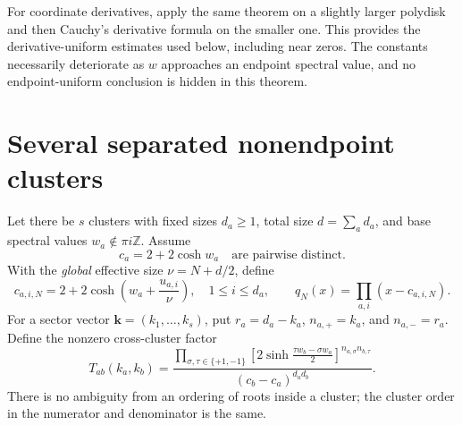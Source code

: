 \documentclass[11pt,a4paper]{article}
\numberwithin{equation}{section}
\theoremstyle{definition}
\theoremstyle{remark}
\newcommand{\ZZ}{\mathbb Z}
\newcommand{\bk}{\boldsymbol{k}}
\begin{document}
For coordinate derivatives, apply the same theorem on a slightly larger
polydisk and then Cauchy's derivative formula on the smaller one. This
provides the derivative-uniform estimates used below, including near
zeros. The constants necessarily deteriorate as $w$ approaches an
endpoint spectral value, and no endpoint-uniform conclusion is hidden
in this theorem.

\section{Several separated nonendpoint clusters}\label{ic:sec:multi}
Let there be $s$ clusters with fixed sizes $d_a\ge1$, total size
$d=\sum_a d_a$, and base spectral values $w_a\notin\pi i\ZZ$. Assume
\begin{equation}\label{ic:eq:distinctbases}
 c_a=2+2\cosh w_a\quad\text{are pairwise distinct}.
\end{equation}
With the \emph{global} effective size $\nu=N+d/2$, define
\begin{equation}\label{ic:eq:multiroots}
 c_{a,i,N}=2+2\cosh\left(w_a+\frac{u_{a,i}}\nu\right),
 \quad 1\le i\le d_a,\qquad
 q_N(x)=\prod_{a,i}(x-c_{a,i,N}).
\end{equation}
For a sector vector $\bk=(k_1,\ldots,k_s)$, put
$r_a=d_a-k_a$, $n_{a,+}=k_a$, and $n_{a,-}=r_a$. Define the nonzero
cross-cluster factor
\begin{equation}\label{ic:eq:crossfactor}
 T_{ab}(k_a,k_b)=
 \frac{\displaystyle\prod_{\sigma,\tau\in\{+1,-1\}}
 \left[2\sinh\frac{\tau w_b-\sigma w_a}{2}\right]
 ^{n_{a,\sigma}n_{b,\tau}}}
 {(c_b-c_a)^{d_ad_b}}.
\end{equation}
There is no ambiguity from an ordering of roots inside a cluster; the
cluster order in the numerator and denominator is the same.
\end{document}
